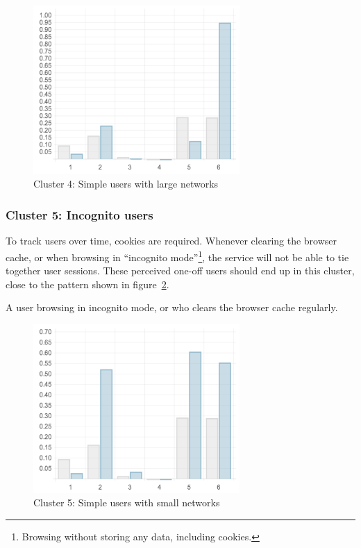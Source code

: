 \begin{figure}[h]
  \centering
    \includegraphics[width=0.7\textwidth]{Figures/clusterings/confluence-post/cluster4-chart}
    \caption{Cluster 4: Simple users with large networks}
    \label{fig:cluster4-chart}
\end{figure}

\subsubsection{Cluster 5: Incognito users}

To track users over time, cookies are required. Whenever clearing the browser cache, or when browsing in ``incognito mode''\footnote{Browsing without storing any data, including cookies.}, the service will not be able to tie together user sessions. These perceived one-off users should end up in this cluster, close to the pattern shown in figure~\ref{fig:cluster5-chart}.

\begin{persona}
  A user browsing in incognito mode, or who clears the browser cache regularly.
\end{persona}

\begin{figure}[h]
  \centering
    \includegraphics[width=0.7\textwidth]{Figures/clusterings/confluence-post/cluster5-chart}
    \caption{Cluster 5: Simple users with small networks}
    \label{fig:cluster5-chart}
\end{figure}

